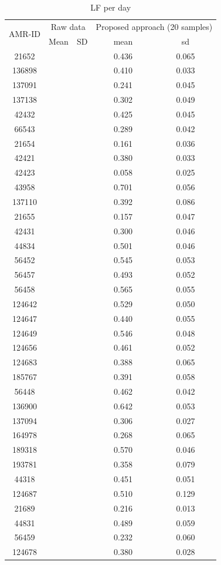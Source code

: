 \documentclass[conference]{IEEEtran}
\begin{document}
\begin{table}[]
  \caption{LF per day}
  \begin{center}
  \begin{tabular}{ccccc}
  \hline
  \multirow{2}{*}{AMR-ID} & \multicolumn{2}{c}{Raw data}               & \multicolumn{2}{c}{Proposed approach (20 samples)}\\
                          & \multicolumn{1}{c}{Mean} & \multicolumn{1}{c}{SD} & \multicolumn{1}{c}{mean}  & \multicolumn{1}{c}{sd} \\
  \hline

  21652 & & & 0.436 & 0.065 \\
  136898 & & & 0.410 & 0.033 \\
  137091 & & & 0.241 & 0.045 \\
  137138 & & & 0.302 & 0.049 \\
  42432 & & & 0.425 & 0.045 \\
  66543 & & & 0.289 & 0.042 \\
  21654 & & & 0.161 & 0.036 \\
  42421 & & & 0.380 & 0.033 \\
  42423 & & & 0.058 & 0.025 \\
  43958 & & & 0.701 & 0.056 \\
  137110 & & & 0.392 & 0.086 \\
  21655 & & & 0.157 & 0.047 \\
  42431 & & & 0.300 & 0.046 \\
  44834 & & & 0.501 & 0.046 \\
  56452 & & & 0.545 & 0.053 \\
  56457 & & & 0.493 & 0.052 \\
  56458 & & & 0.565 & 0.055 \\
  124642 & & & 0.529 & 0.050 \\
  124647 & & & 0.440 & 0.055 \\
  124649 & & & 0.546 & 0.048 \\
  124656 & & & 0.461 & 0.052 \\
  124683 & & & 0.388 & 0.065 \\
  185767 & & & 0.391 & 0.058 \\
  56448 & & & 0.462 & 0.042 \\
  136900 & & & 0.642 & 0.053 \\
  137094 & & & 0.306 & 0.027 \\
  164978 & & & 0.268 & 0.065 \\
  189318 & & & 0.570 & 0.046 \\
  193781 & & & 0.358 & 0.079 \\
  44318 & & & 0.451 & 0.051 \\
  124687 & & & 0.510 & 0.129 \\
  21689 & & & 0.216 & 0.013 \\
  44831 & & & 0.489 & 0.059 \\
  56459 & & & 0.232 & 0.060 \\
  124678 & & & 0.380 & 0.028 \\
  \hline
  \end{tabular}
  \label{tab.res_LF}
  \end{center}
\end{table}
\end{document}

